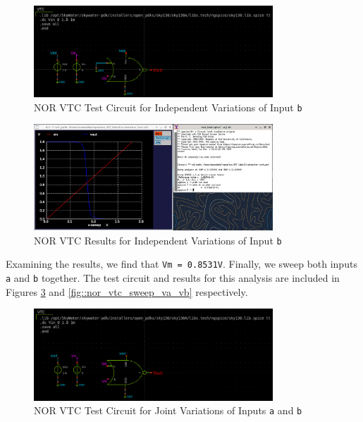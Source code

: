 \documentclass[fleqn]{article}
\begin{document}
	\begin{figure}[H]
		\centerline{\includegraphics[width=0.8\textwidth]{nor_vtc_test_sweep_vb.png}}
		\caption{NOR VTC Test Circuit for Independent Variations of Input \texttt{b}}
		\label{fig::nor_vtc_test_sweep_vb}
	\end{figure}
	
	\begin{figure}[H]
		\centerline{\includegraphics[width=0.8\textwidth]{nor_vtc_sweep_vb.png}}
		\caption{NOR VTC Results for Independent Variations of Input \texttt{b}}
		\label{fig::nor_vtc_sweep_vb}
	\end{figure}
	
	Examining the results, we find that \texttt{Vm = 0.8531V}. Finally, we sweep both inputs \texttt{a} and \texttt{b} together. The test circuit and results for this analysis are included in Figures \ref{fig::nor_vtc_test_sweep_va_vb} and \ref{fig::nor_vtc_sweep_va_vb} respectively.
	
	\begin{figure}[H]
		\centerline{\includegraphics[width=0.8\textwidth]{nor_vtc_test_sweep_va_vb.png}}
		\caption{NOR VTC Test Circuit for Joint Variations of Inputs \texttt{a} and \texttt{b}}
		\label{fig::nor_vtc_test_sweep_va_vb}
	\end{figure}
	
\end{document}
